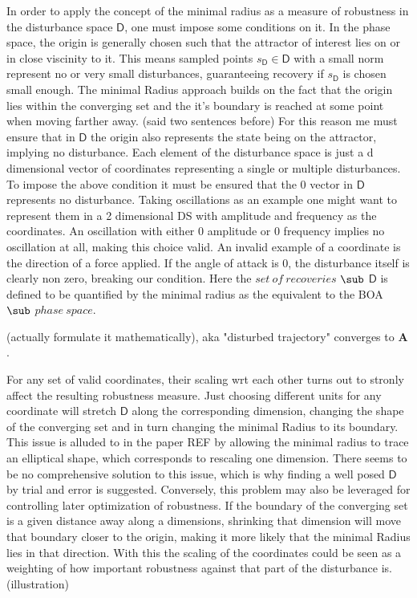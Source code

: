     In order to apply the concept of the minimal radius as a measure of robustness in the disturbance space $\mathsf{D}$, one must impose some conditions on it.
    In the phase space, the origin is generally chosen such that the attractor of interest lies on or in close viscinity to it. This means sampled points $s_{\mathsf{D}} \in \mathsf{D}$ with a small norm represent no or very small disturbances, guaranteeing recovery if $s_{\mathsf{D}}$ is chosen small enough. The minimal Radius approach builds on the fact that the origin lies within the converging set and the it's boundary is reached at some point when moving farther away. (said two sentences before) 
    For this reason me must ensure that in $\mathsf{D}$ the origin also represents the state being on the attractor, implying no disturbance.
    Each element of the disturbance space is just a d dimensional vector of coordinates representing a single or multiple disturbances. To impose the above condition it must be ensured that the 0 vector in $\mathsf{D}$ represents no disturbance. 
    Taking oscillations as an example one might want to represent them in a 2 dimensional DS with amplitude and frequency as the coordinates. An oscillation with either 0 amplitude or 0 frequency implies no oscillation at all, making this choice valid.
    An invalid example of a coordinate is the direction of a force applied. If the angle of attack is 0, the disturbance itself is clearly non zero, breaking our condition.
    Here the $set\ of\ recoveries$ $\sub$ $\mathsf{D}$ is defined to be quantified by the minimal radius as the equivalent to the BOA $\sub$ $phase\ space$.

    (actually formulate it mathematically), aka "disturbed trajectory" converges to $\mathbf{A}$.


    For any set of valid coordinates, their scaling wrt each other turns out to stronly affect the resulting robustness measure. Just choosing different units for any coordinate will stretch $\mathsf{D}$ along the corresponding dimension, changing the shape of the converging set and in turn changing the minimal Radius to its boundary. This issue is alluded to in the paper REF by allowing the minimal radius to trace an elliptical shape, which corresponds to rescaling one dimension. There seems to be no comprehensive solution to this issue, which is why finding a well posed $\mathsf{D}$ by trial and error is suggested. 
    Conversely, this problem may also be leveraged for controlling later optimization of robustness. If the boundary of the converging set is a given distance away along a dimensions, shrinking that dimension will move that boundary closer to the origin, making it more likely that the minimal Radius lies in that direction. With this the scaling of the coordinates could be seen as a weighting of how important robustness against that part of the disturbance is. 
    (illustration)

